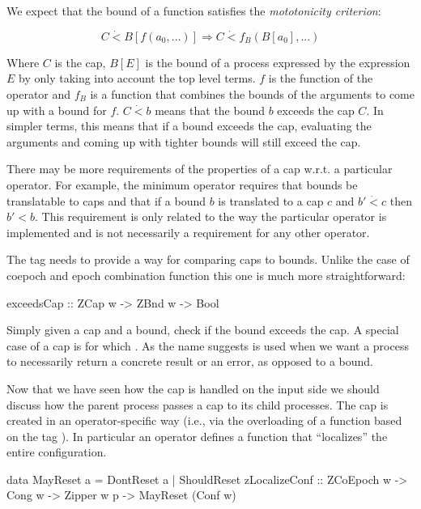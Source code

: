 We expect that the bound of a function satisfies the
\emph{mototonicity criterion}:

\[
C \dot{<} B[ f(a_0, ...)] \Rightarrow C \dot{<} f_B(B[a_0],...)
\]

Where \(C\) is the cap, \(B[E]\) is the bound of a process expressed
by the expression \(E\) by only taking into account the top level
terms. \(f\) is the function of the operator and \(f_B\) is a function
that combines the bounds of the arguments to come up with a bound for
\(f\). \(C \dot{<} b\) means that the bound \(b\) exceeds the cap
\(C\). In simpler terms, this means that if a bound exceeds the cap,
evaluating the arguments and coming up with tighter bounds will still
exceed the cap.

There may be more requirements of the properties of a cap w.r.t. a
particular operator. For example, the minimum operator requires that
bounds be translatable to caps and that if a bound \(b\) is translated
to a cap \(c\) and \(b' \dot{<} c\) then \(b' < b\). This requirement
is only related to the way the particular operator is implemented and
is not necessarily a requirement for any other operator.


The  tag  needs to provide a way for
comparing caps to bounds. Unlike the case of coepoch and epoch
combination function this one is much more straightforward:

\begin{haskellcode}
exceedsCap :: ZCap w -> ZBnd w -> Bool
\end{haskellcode}

Simply given a cap and a bound, check if the bound exceeds the cap. A
special case of a cap is  for which
. As the name suggests
 is used when we want a process to necessarily
return a concrete result or an error, as opposed to a bound.

Now that we have seen how the cap is handled on the input side we
should discuss how the parent process passes a cap to its child
processes. The cap is created in an operator-specific way (i.e., via the
overloading of a function based on the tag ). In particular an
operator defines a function that ``localizes'' the entire configuration.

\begin{haskellcode}
data MayReset a = DontReset a | ShouldReset
zLocalizeConf :: ZCoEpoch w -> Cong w -> Zipper w p -> MayReset (Conf w)
\end{haskellcode}

